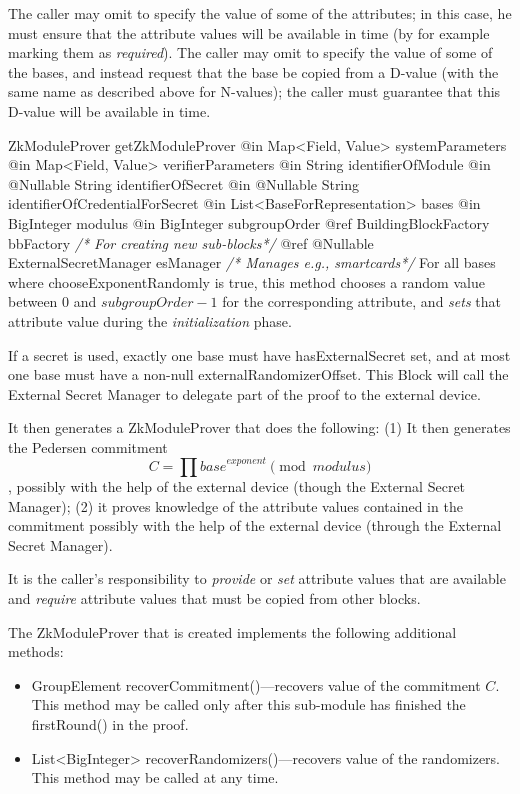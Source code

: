     The caller may omit to specify the value of some of the attributes; in this case, he must
    ensure that the attribute values will be available in time (by for example marking them as \emph{required}).
    The caller may omit to specify the value of some of the bases, and instead request
    that the base be copied from a D-value (with the same name as described above for N-values);
    the caller must guarantee that this D-value will be available in time.
      \begin{method}
      {ZkModuleProver}
      {getZkModuleProver}
      {
        {@in Map<Field, Value> systemParameters}
        {@in Map<Field, Value> verifierParameters}
        {@in String identifierOfModule}
        {@in @Nullable String identifierOfSecret}
        {@in @Nullable String identifierOfCredentialForSecret}
        {@in List<BaseForRepresentation> bases}
        {@in BigInteger modulus}
        {@in BigInteger subgroupOrder}
        {@ref BuildingBlockFactory bbFactory \textrm{\emph{/* For creating new sub-blocks*/}}}
        {@ref @Nullable ExternalSecretManager esManager \textrm{\emph{/* Manages e.g., smartcards*/}}}
      }
      For all bases where chooseExponentRandomly is true, this method chooses a random value between $0$ and
      $\textit{subgroupOrder}-1$ for the
      corresponding attribute, and \emph{sets} that attribute value during the \emph{initialization} phase.

      If a secret is used, exactly one base must have hasExternalSecret set, and at most one base must have a
      non-null externalRandomizerOffset. This Block will call the External Secret Manager to delegate part of
      the proof to the external device.

      It then generates a ZkModuleProver that does the following:
      (1) It then generates the Pedersen commitment $$C = \prod \textit{base}^\textit{exponent} \pmod{\textit{modulus}}$$,
      possibly with the help of the external device (though the External Secret Manager);
      (2) it proves knowledge of the attribute values contained in the commitment possibly with the help of the
      external device (through the External Secret Manager).

      It is the caller's responsibility to \emph{provide} or \emph{set} attribute values that are available and \emph{require}
      attribute values that must be copied from other blocks.

      The ZkModuleProver that is created implements the following additional methods:
        \begin{itemize}
          \item GroupElement recoverCommitment()---recovers value of the commitment $C$. This method may be called only after this sub-module
             has finished the firstRound() in the proof.
          \item List<BigInteger> recoverRandomizers()---recovers value of the randomizers. This method may be called at any time.
        \end{itemize}

      \end{method}
